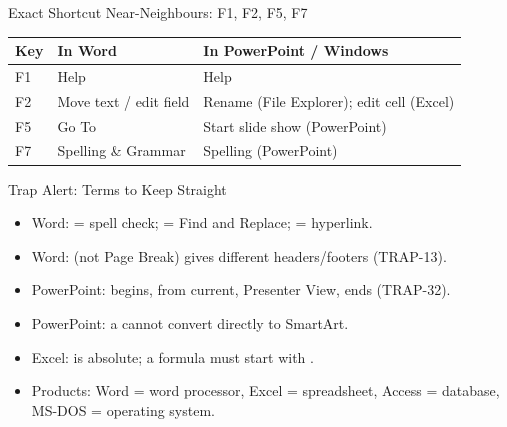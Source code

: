 \documentclass[aspectratio=169]{beamer}
\begin{document}
\begin{frame}{Exact Shortcut Near-Neighbours: F1, F2, F5, F7}
  \begin{center}
    \begin{tabular}{p{}p{}p{}}
      \toprule
      \textbf{Key} & \textbf{In Word} & \textbf{In PowerPoint / Windows} \\
      \midrule
      F1 & Help & Help \\
      F2 & Move text / edit field & Rename (File Explorer); edit cell (Excel) \\
      F5 & Go To & Start slide show (PowerPoint) \\
      F7 & Spelling \& Grammar & Spelling (PowerPoint) \\
      \bottomrule
    \end{tabular}
  \end{center}
  \vspace{0.25cm}
\end{frame}

\begin{frame}{Trap Alert: Terms to Keep Straight}
  \begin{itemize}
    \item Word:  = spell check;  = Find and Replace;
       = hyperlink.
    \item Word:  (not Page Break) gives different
      headers/footers (TRAP-13).
    \item PowerPoint:  begins,  from current,
       Presenter View,  ends (TRAP-32).
    \item PowerPoint: a  cannot convert directly to SmartArt.
    \item Excel:  is absolute; a formula must start with \key{=}.
    \item Products: Word = word processor, Excel = spreadsheet,
      Access = database, MS-DOS = operating system.
  \end{itemize}
\end{frame}
\end{document}

